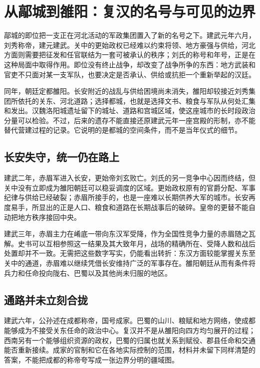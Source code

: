 \section{从鄗城到雒阳：复汉的名号与可见的边界}
\label{sec:eastern-han-restoration}

鄗城的即位把一支正在河北活动的军政集团置入了新的名号之下。建武元年六月，刘秀称帝，建元建武。关中的更始政权已经难以约束将领、地方豪强与供给，河北方面则需要把征发和任官联结为一套可被承认的秩序；刘氏的称号和年号，正是在这种局面中取得作用。即位没有终止战争，却改变了战争所争的东西：地方武装和官吏不只面对某一支军队，也要决定是否承认、供给或抗拒一个重新举起的汉廷。

同年，朝廷定都雒阳。长安附近的战乱与供给困境尚未消失，雒阳却较接近刘秀集团所依托的关东、河北道路；选择都城，也就是选择文书、粮食与军队从何处汇集和发出。汉魏洛阳城遗址留下的城址、道路和宫城区域，使这座城市的长时段政治分量可以检验。不过，后来的遗存不能直接还原建武元年一座宫殿的形制，亦不能替代营建过程的记录。它说明的是都城的空间条件，而不是当年仪式的细节。

\subsection{长安失守，统一仍在路上}

建武二年，赤眉军进入长安，更始帝刘玄败亡。刘氏的另一竞争中心因而终结，但关中没有立即成为雒阳朝廷可以稳妥调度的区域。更始政权原有的官爵分配、军事纪律与供给已经破裂；赤眉所接手的，也是一座难以长期供养大军的城市。长安再度易手，所显出的正是人口、粮食和道路在长期战事后的破碎。皇帝的更替不能自动把地方秩序接回中央。

建武三年，赤眉主力在崤底一带向东汉军受降，作为全国性竞争力量的赤眉随之瓦解。史书可以互相参照这一结果及其大致年月，战场的精确所在、受降人数和战后处置却并不一致。无需把这些数字写实，仍能看出转折：东汉方面较能掌握关东至关中的通道，赤眉难以继续凭借长安维持广泛的军事存在。雒阳朝廷从而有条件将兵力和任命投向陇右、巴蜀以及其他尚未归服的地区。

\subsection{通路并未立刻合拢}

建武六年，公孙述在成都称帝，国号成家。巴蜀的山川、粮赋和地方网络，使成都能够成为不接受关东任命的政治中心。复汉并不是从雒阳向四方均匀展开的过程；西南另有一个能够组织资源的政权，巴蜀的归属也就关系到赋役、郡县任命和交通能否重新接续。成家的官制和它在各地实际控制的范围，材料并未留下同样清楚的答案，不能把成都的称帝夸写成一张边界分明的疆域图。

